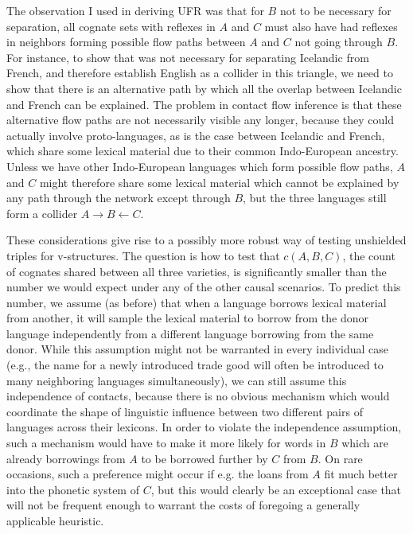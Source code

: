 The observation I used in deriving UFR was that for $B$ not to be necessary for separation, all cognate sets with reflexes in $A$ and $C$ must also have had reflexes in neighbors forming possible flow paths between $A$ and $C$ not going through $B$. For instance, to show that  was not necessary for separating Icelandic from French, and therefore establish English as a collider in this triangle, we need to show that there is an alternative path by which all the overlap between Icelandic and French can be explained. The problem in contact flow inference is that these alternative flow paths are not necessarily visible any longer, because they could actually involve proto-languages, as is the case between Icelandic and French, which share some lexical material due to their common Indo-European ancestry. Unless we have other Indo-European languages which form possible flow paths, $A$ and $C$ might therefore share some lexical material which cannot be explained by any path through the network except 
through $B$, but the three languages still form a collider $A \rightarrow B \leftarrow C$.

These considerations give rise to a possibly more robust way of testing unshielded triples for v-structures. The question is how to test that $c(A,B,C)$, the count of cognates shared between all three varieties, is significantly smaller than the number we would expect under any of the other causal scenarios. To predict this number, we assume (as before) that when a language borrows lexical material from another, it will sample the lexical material to borrow from the donor language independently from a different language borrowing from the same donor. While this assumption might not be warranted in every individual case (e.g., the name for a newly introduced trade good will often be introduced to many neighboring languages simultaneously), we can still assume this independence of contacts, because there is no obvious mechanism which would coordinate the shape of linguistic influence between two different pairs of languages across their lexicons. In order to violate the independence assumption, such a 
mechanism would have to make it more likely for words in $B$ which are already borrowings from $A$ to be borrowed further by $C$ from $B$. On rare occasions, such a preference might occur if e.g. the loans from $A$ fit much better into the phonetic system of $C$, but this would clearly be an exceptional case that will not be frequent enough to warrant the costs of foregoing a generally applicable heuristic.

